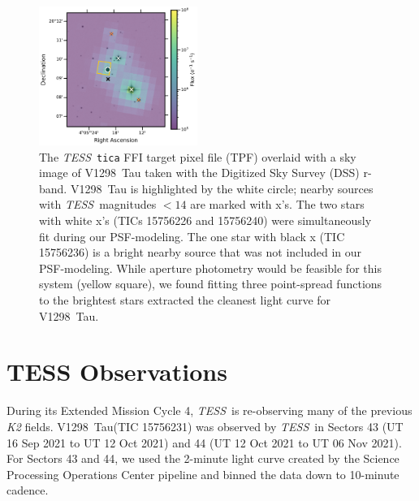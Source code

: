 \documentclass[twocolumn]{aastex631}
\newcommand{\githubicon}{{\color{black}\faGithub}}
\newcommand{\tess}{\textit{TESS}}
\newcommand{\sname}{V1298~Tau\xspace}
\begin{document}
\begin{figure}[t!]
\begin{center}
\includegraphics[width=0.46\textwidth,trim={0.25cm 0 0 0}]{static/TESSaperture.pdf}
\caption{The \tess\ \texttt{tica} FFI target pixel file (TPF) overlaid with a sky image of \sname taken with the Digitized Sky Survey (DSS) r-band. \sname is highlighted by the white circle; nearby sources with \tess\ magnitudes $< 14$ are marked with x's. The two stars with white x's (TICs 15756226 and 15756240) were simultaneously fit during our PSF-modeling. The one star with black x (TIC 15756236) is a bright nearby source that was not included in our PSF-modeling. While aperture photometry would be feasible for this system (yellow square), we found fitting three point-spread functions to the brightest stars extracted the cleanest light curve for \sname. \href{https://github.com/afeinstein20/v1298tau\_tess/blob/main/src/figures/tpf.py}{\githubicon}} \label{fig:tpf}
\end{center}
\end{figure}

\section{TESS Observations} \label{sec:observations}

During its Extended Mission Cycle 4, \tess\ is re-observing many of the previous \textit{K2} fields. \sname (TIC 15756231) was observed by \tess\ in Sectors 43 (UT 16 Sep 2021 to UT 12 Oct 2021) and 44 (UT 12 Oct 2021 to UT 06 Nov 2021). For Sectors 43 and 44, we used the 2-minute light curve created by the Science Processing Operations Center pipeline \citep[SPOC;][]{jenkinsSPOC2016} and binned the data down to 10-minute cadence.%
\end{document}
